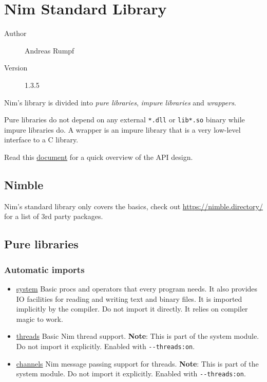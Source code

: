\hypertarget{nim-standard-library}{%
\section{Nim Standard Library}\label{nim-standard-library}}

\begin{description}
\item[Author]
Andreas Rumpf
\item[Version]
1.3.5
\end{description}

Nim's library is divided into \emph{pure libraries}, \emph{impure
libraries} and \emph{wrappers}.

Pure libraries do not depend on any external \texttt{*.dll} or
\texttt{lib*.so} binary while impure libraries do. A wrapper is an
impure library that is a very low-level interface to a C library.

Read this \href{apis.html}{document} for a quick overview of the API
design.

\hypertarget{nimble}{%
\subsection{Nimble}\label{nimble}}

Nim's standard library only covers the basics, check out
\url{https://nimble.directory/} for a list of 3rd party packages.

\hypertarget{pure-libraries}{%
\subsection{Pure libraries}\label{pure-libraries}}

\hypertarget{automatic-imports}{%
\subsubsection{Automatic imports}\label{automatic-imports}}

\begin{itemize}
\tightlist
\item
  \href{system.html}{system} Basic procs and operators that every
  program needs. It also provides IO facilities for reading and writing
  text and binary files. It is imported implicitly by the compiler. Do
  not import it directly. It relies on compiler magic to work.
\item
  \href{threads.html}{threads} Basic Nim thread support. \textbf{Note}:
  This is part of the system module. Do not import it explicitly.
  Enabled with \texttt{-\/-threads:on}.
\item
  \href{channels.html}{channels} Nim message passing support for
  threads. \textbf{Note}: This is part of the system module. Do not
  import it explicitly. Enabled with \texttt{-\/-threads:on}.
\end{itemize}

